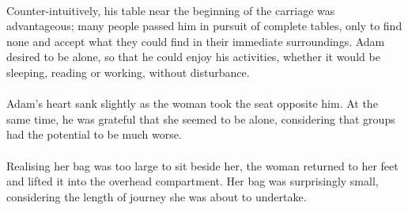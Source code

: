 \documentclass{article}
\begin{document}
\paragraph{}
Counter-intuitively, his table near the beginning of the carriage was advantageous; many people passed him in pursuit of complete tables, only to find none and accept what they could find in their immediate surroundings. Adam desired to be alone, so that he could enjoy his activities, whether it would be sleeping, reading or working, without disturbance.

\paragraph{}
Adam's heart sank slightly as the woman took the seat opposite him. At the same time, he was grateful that she seemed to be alone, considering that groups had the potential to be much worse.

\paragraph{}
Realising her bag was too large to sit beside her, the woman returned to her feet and lifted it into the overhead compartment. Her bag was surprisingly small, considering the length of journey she was about to undertake.
\end{document}
